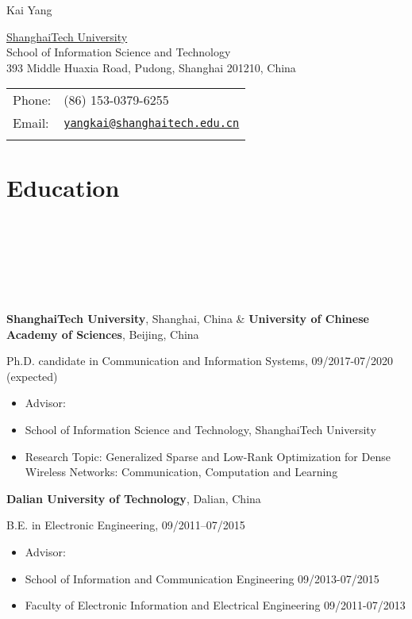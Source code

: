 \documentclass{article}
\def\name{Kai Yang}
\newcommand{\homepage}[3][homepagecolor]{\href{#2}{\color{#1}{#3}}}
\begin{document}
{\huge \name}


\vspace{0.2in}

\begin{minipage}{0.55\linewidth}
  \href{http://www.shanghaitech.edu.cn}{ShanghaiTech University} \\
  School of Information Science and Technology \\
393 Middle Huaxia Road, Pudong, Shanghai 201210, China
\end{minipage}\hspace{2em}
\begin{minipage}{0.45\linewidth}
  \begin{tabular}{ll}
    Phone: & (86) 153-0379-6255 \\
    Email: & \href{mailto:yangkai@shanghaitech.edu.cn}{\tt yangkai@shanghaitech.edu.cn} \\ &\\
  \end{tabular}
\end{minipage}


\section*{\colorbox{mygrey}{Education~~~~~~~~~~~~~~~~~~~~~~~~~~~~~~~~~~~~~~~~~~~~~~~~~~~~~~~~~~~~~~~~~~~~~~~~~~~~~~~~~~~~~~~~~~~}}
{\bf{ShanghaiTech University}}, Shanghai, China \& {\bf{University of Chinese Academy of Sciences}}, Beijing, China

Ph.D. candidate in Communication and Information Systems, 09/2017-07/2020 (expected) 
\begin{itemize}
  \item Advisor: \homepage{http://shiyuanming.github.io/}{Prof. Yuanming Shi}
  \item School of Information Science and Technology, ShanghaiTech University
  \item Research Topic: {{Generalized Sparse and Low-Rank Optimization for Dense Wireless Networks: Communication, Computation and Learning}}
\end{itemize}

{\bf{Dalian University of Technology}}, Dalian, China

B.E. in Electronic Engineering, 09/2011--07/2015
\begin{itemize}
\item Advisor: \homepage{http://faculty.dlut.edu.cn/GuoYanqing}{Prof. Yanqing Guo}
\item School of Information and Communication Engineering 09/2013-07/2015
\item Faculty of Electronic Information and Electrical Engineering 09/2011-07/2013
\end{itemize}
\end{document}
